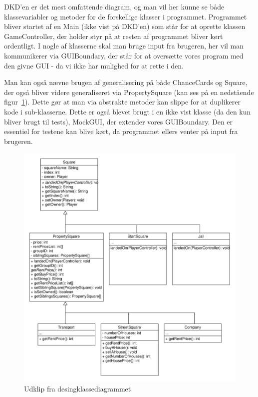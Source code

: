 \documentclass[class=article, crop=false]{standalone}
\begin{document}
DKD’en er det mest omfattende diagram, og man vil her kunne se både klassevariabler og metoder for de forskellige klasser i programmet. Programmet bliver startet af en Main (ikke vist på DKD’en) som står for at oprette klassen GameController, der holder styr på at resten af programmet bliver kørt ordentligt. I nogle af klasserne skal man bruge input fra brugeren, her vil man kommunikerer via GUIBoundary, der står for at oversætte vores program med den givne GUI - da vi ikke har mulighed for at rette i den. \par
Man kan også nævne brugen af generalisering på både ChanceCards og Square, der også bliver videre generaliseret via PropertySquare (kan ses på en nedstående figur~\ref{fig:DKD_udklip}). Dette gør at man via abstrakte metoder kan slippe for at duplikerer kode i sub-klasserne. Dette er også blevet brugt i en ikke vist klasse (da den kun bliver brugt til tests), MockGUI, der extender vores GUIBoundary. Den er essentiel for testene kan blive kørt, da programmet ellers venter på input fra brugeren.

\begin{figure}[H]
    \centering
    \includegraphics[scale = 0.5]{diagrams/DKD_udklip.pdf}
    \caption{Udklip fra desingklassediagrammet}\label{fig:DKD_udklip}
\end{figure}
\end{document}
